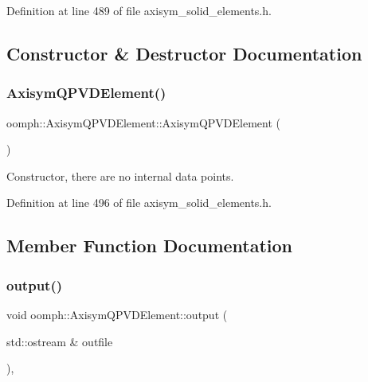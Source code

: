Definition at line 489 of file axisym\+\_\+solid\+\_\+elements.\+h.



\subsection{Constructor \& Destructor Documentation}
\mbox{\label{classoomph_1_1AxisymQPVDElement_a0cd0c4e03f099140ce3655fcab3c3ef3}} 
\subsubsection{\texorpdfstring{Axisym\+Q\+P\+V\+D\+Element()}{AxisymQPVDElement()}}
{\footnotesize\ttfamily oomph\+::\+Axisym\+Q\+P\+V\+D\+Element\+::\+Axisym\+Q\+P\+V\+D\+Element (\begin{DoxyParamCaption}{ }\end{DoxyParamCaption})\hspace{0.3cm}{\ttfamily [inline]}}



Constructor, there are no internal data points. 



Definition at line 496 of file axisym\+\_\+solid\+\_\+elements.\+h.



\subsection{Member Function Documentation}
\mbox{\label{classoomph_1_1AxisymQPVDElement_ac2a240575dea087098520bf6f9567dc2}} 
\subsubsection{\texorpdfstring{output()}{output()}\hspace{0.1cm}{\footnotesize\ttfamily [1/4]}}
{\footnotesize\ttfamily void oomph\+::\+Axisym\+Q\+P\+V\+D\+Element\+::output (\begin{DoxyParamCaption}\item[{std\+::ostream \&}]{outfile }\end{DoxyParamCaption})\hspace{0.3cm}{\ttfamily [inline]}, {\ttfamily [virtual]}}



